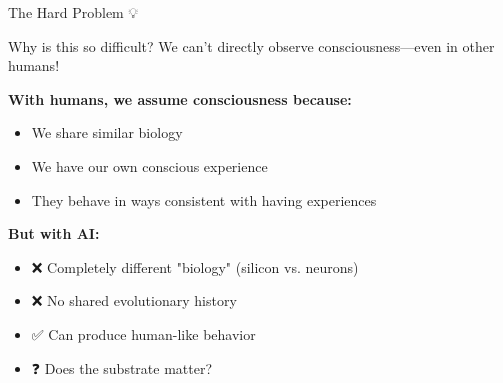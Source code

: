 \documentclass[aspectratio=169]{beamer}
\begin{document}
\begin{frame}[shrink=10]{The Hard Problem 💡}
\begin{block}{Why is this so difficult?}
We can't directly observe consciousness—even in other humans!
\end{block}

\vspace{0.3cm}

\small
\textbf{With humans, we assume consciousness because:}
\begin{itemize}\setlength{\itemsep}{0pt}\setlength{\itemsep}{0pt}
    \item We share similar biology
    \item We have our own conscious experience
    \item They behave in ways consistent with having experiences
\end{itemize}

\vspace{0.3cm}

\textbf{But with AI:}
\begin{itemize}\setlength{\itemsep}{0pt}\setlength{\itemsep}{0pt}
    \item ❌ Completely different "biology" (silicon vs. neurons)
    \item ❌ No shared evolutionary history
    \item ✅ Can produce human-like behavior
    \item ❓ Does the substrate matter?
\end{itemize}
\end{frame}
\end{document}
